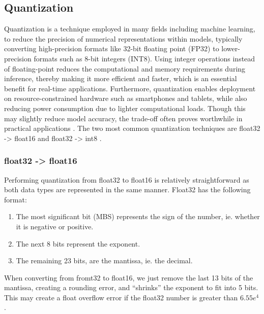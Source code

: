 \documentclass[licencjacka,en]{pracamgr}
\begin{document}
\subsection{Quantization}
Quantization is a technique employed in many fields including machine learning, to reduce the precision of numerical representations within models, typically converting high-precision formats like 32-bit floating point (FP32) to lower-precision formats such as 8-bit integers (INT8). Using integer operations instead of floating-point reduces the computational and memory requirements during inference, thereby making it more efficient and faster, which is an essential benefit for real-time applications. Furthermore, quantization enables deployment on resource-constrained hardware such as smartphones and tablets, while also reducing power consumption due to lighter computational loads. Though this may slightly reduce model accuracy, the trade-off often proves worthwhile in practical applications \cite{ibm_quantization}.
The two most common quantization techniques are float32 -> float16 and float32 -> int8 \cite{quant_hf}.
\subsubsection{float32 -> float16}
Performing quantization from float32 to float16 is relatively straightforward as both data types are represented in the same manner. Float32 has the following format: 
\begin{enumerate}
	\item The most significant bit (MBS) represents the sign of the number, ie. whether it is negative or positive.
	\item The next 8 bits represent the exponent.
	\item The remaining 23 bits, are the mantissa, ie. the decimal.
\end{enumerate}

When converting from fromt32 to float16, we just remove the last 13 bits of the mantissa, creating a rounding error, and “shrinks” the exponent to fit into 5 bits. This may create a float overflow error if the float32 number is greater than $ 6.55e^4$ \cite{quant_explained}. 
\end{document}
